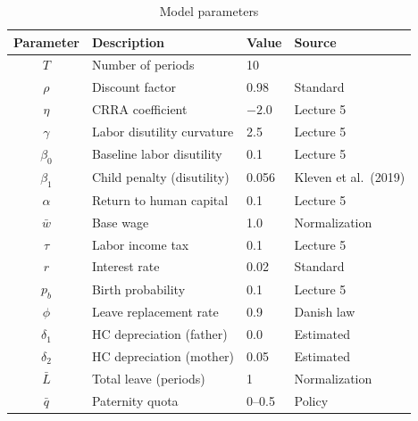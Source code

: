 \begin{table}[H]
\centering
\caption{Model parameters}
\label{tab:params}
\begin{tabular}{clll}
\toprule
Parameter & Description & Value & Source \\
\midrule
$T$       & Number of periods          & 10     & \\
$\rho$    & Discount factor            & 0.98   & Standard \\
$\eta$    & CRRA coefficient           & $-2.0$ & Lecture 5 \\
$\gamma$  & Labor disutility curvature & 2.5    & Lecture 5 \\
$\beta_0$ & Baseline labor disutility  & 0.1    & Lecture 5 \\
$\beta_1$ & Child penalty (disutility) & 0.056  & Kleven et al.\ (2019) \\
$\alpha$  & Return to human capital    & 0.1    & Lecture 5 \\
$\bar{w}$ & Base wage                  & 1.0    & Normalization \\
$\tau$    & Labor income tax           & 0.1    & Lecture 5 \\
$r$       & Interest rate              & 0.02   & Standard \\
$p_b$     & Birth probability          & 0.1    & Lecture 5 \\
$\phi$    & Leave replacement rate     & 0.9    & Danish law \\
$\delta_1$& HC depreciation (father)   & 0.0    & Estimated \\
$\delta_2$& HC depreciation (mother)   & 0.05   & Estimated \\
$\bar{L}$ & Total leave (periods)      & 1      & Normalization \\
$\bar{q}$ & Paternity quota            & 0--0.5 & Policy \\
\bottomrule
\end{tabular}
\end{table}
